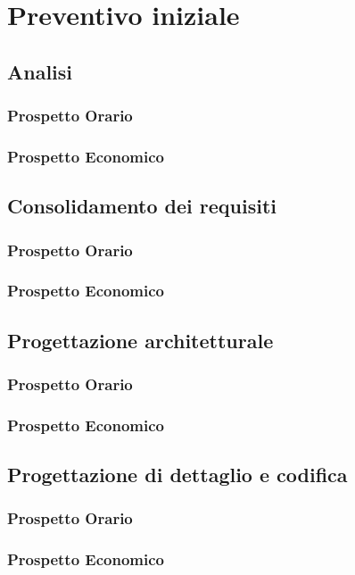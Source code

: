 \documentclass[PianoDiProgetto.tex]{subfiles}
\begin{document}
\chapter{Preventivo iniziale}

\section{Analisi}
\subsection{Prospetto Orario}
\subsection{Prospetto Economico}

\section{Consolidamento dei requisiti}
\subsection{Prospetto Orario}
\subsection{Prospetto Economico}

\section{Progettazione architetturale}
\subsection{Prospetto Orario}
\subsection{Prospetto Economico}

\section{Progettazione di dettaglio e codifica}
\subsection{Prospetto Orario}
\subsection{Prospetto Economico}
\end{document}
